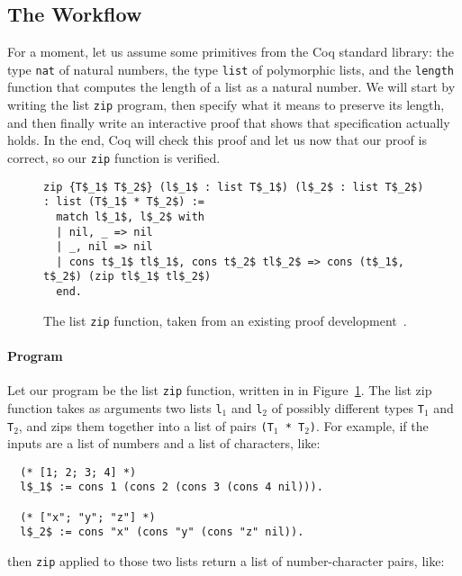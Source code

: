 \subsection{The Workflow}
\label{sec:mot-workflow}

For a moment, let us assume some primitives from the Coq standard library: the type \lstinline{nat} of natural numbers,
the type \lstinline{list} of polymorphic lists, and the \lstinline{length} function that computes the length of a list as a natural number.
We will start by writing the list \lstinline{zip} program, then specify what it means to preserve its length, and then finally
write an interactive proof that shows that specification actually holds.
In the end, Coq will check this proof and let us now that our proof is correct, so our \lstinline{zip} function is verified.

\begin{figure}
\begin{lstlisting}
zip {T$_1$ T$_2$} (l$_1$ : list T$_1$) (l$_2$ : list T$_2$) : list (T$_1$ * T$_2$) :=
  match l$_1$, l$_2$ with
  | nil, _ => nil
  | _, nil => nil
  | cons t$_1$ tl$_1$, cons t$_2$ tl$_2$ => cons (t$_1$, t$_2$) (zip tl$_1$ tl$_2$)
  end.
\end{lstlisting}
\caption{The list \lstinline{zip} function, taken from an existing proof development~\cite{hstocoqv}.} %
\label{fig:zip}
\end{figure}

\paragraph{Program} Let our program be the list \lstinline{zip} function, written in  in Figure~\ref{fig:zip}.
The list zip function takes as arguments two lists \lstinline{l}$_1$ and \lstinline{l}$_2$ of possibly different types \lstinline{T}$_1$ and \lstinline{T}$_2$, and zips them together into
a list of pairs \lstinline{(T}$_1$\lstinline{ * T}$_2$\lstinline{)}.
For example, if the inputs are a list of numbers and a list of characters, like:

\begin{lstlisting}
  (* [1; 2; 3; 4] *)
  l$_1$ := cons 1 (cons 2 (cons 3 (cons 4 nil))).

  (* ["x"; "y"; "z"] *)
  l$_2$ := cons "x" (cons "y" (cons "z" nil)).
\end{lstlisting}
then \lstinline{zip} applied to those two lists return a list of number-character pairs, like:

